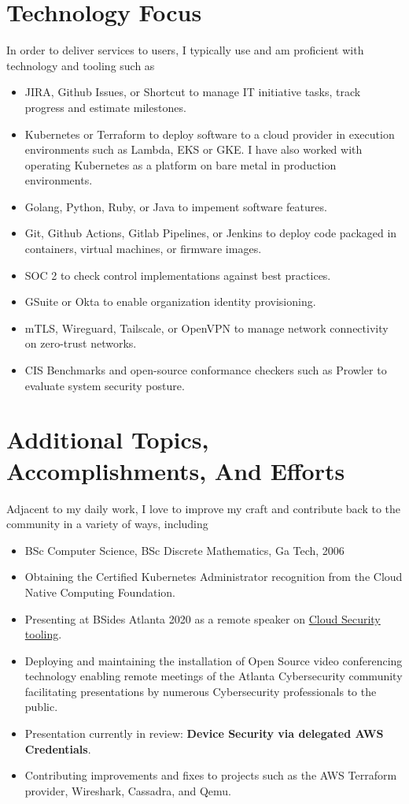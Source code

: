\documentclass[letterpaper,10pt]{article}
\begin{document}
\section{Technology Focus}
In order to deliver services to users, I typically use and am proficient with technology and tooling such as
\begin{itemize}
	\setlength\itemsep{0.1em}
	\item JIRA, Github Issues, or Shortcut to manage IT initiative tasks, track progress and estimate milestones.
	\item Kubernetes or Terraform to deploy software to a cloud provider in execution environments such as Lambda, EKS or GKE. I have also worked with operating Kubernetes as a platform on bare metal in production environments.
	\item Golang,  Python,  Ruby, or Java to impement software features.
	\item Git, Github Actions, Gitlab Pipelines, or Jenkins to deploy code packaged in containers, virtual machines, or firmware images.
	\item SOC 2 to check control implementations against best practices.
	\item GSuite or Okta to enable organization identity provisioning.
	\item mTLS, Wireguard, Tailscale, or OpenVPN to manage network connectivity on zero-trust networks.
	\item CIS Benchmarks and open-source conformance checkers such as Prowler to evaluate system security posture.
\end{itemize}

\section{Additional Topics, Accomplishments, And Efforts}
Adjacent to my daily work, I love to improve my craft and contribute back to the community in a variety of ways, including
\begin{itemize}
	\setlength\itemsep{0.1em}
	\item BSc Computer Science, BSc Discrete Mathematics, Ga Tech, 2006
	\item Obtaining the Certified Kubernetes Administrator recognition from the Cloud Native Computing Foundation.
	\item Presenting at BSides Atlanta 2020 as a remote speaker on \href{https://www.youtube.com/watch?v=kLCaAaUd1mM}{\color{blue}Cloud Security tooling}.
	\item Deploying and maintaining the installation of Open Source video conferencing technology enabling remote meetings of the Atlanta Cybersecurity community facilitating presentations by numerous Cybersecurity professionals to the public.
	\item Presentation currently in review: \textbf{Device Security via delegated AWS Credentials}.
	\item Contributing improvements and fixes to projects such as the AWS Terraform provider, Wireshark, Cassadra, and Qemu.
\end{itemize}
\end{document}
